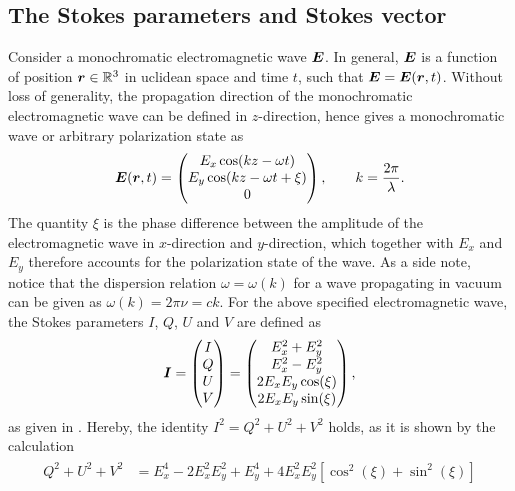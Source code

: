 \documentclass[a4paper,11pt]{report}
\def\lk#1{{\color{black}{#1}}}
\begin{document}
\subsection{The Stokes parameters and Stokes vector}
Consider a monochromatic electromagnetic wave $\bm{E}$. In general, $\bm{E}$ is a function of position $\bm{r} \in \mathbb{R}^3$ in \lk{E}uclidean space and time $t$, such that $\bm{E} = \bm{E}(\bm{r},t)$. Without loss of generality, the propagation direction of the monochromatic electromagnetic wave can be defined in $z$-direction, hence \cite[p.121]{Stix.2002} gives a monochromatic wave or arbitrary polarization state as \begin{equation}\label{eq:E-wave}
\bm{E}(\bm{r},t) = \begin{pmatrix}
E_x \cos(k z - \omega t) \\ E_y \cos(kz-\omega t + \xi) \\ 0
\end{pmatrix}, \qquad k = \frac{2\pi}{\lambda}.
\end{equation} The quantity $\xi$ is the phase difference between the amplitude of the electromagnetic wave in $x$-direction and $y$-direction, which together with $E_x$ and $E_y$ therefore accounts for the polarization state of the wave. As a side note, notice that the dispersion relation $\omega = \omega(k)$ for a wave propagating in vacuum can be given as $\omega(k) = 2\pi\nu = ck$. For the above specified electromagnetic wave, the Stokes parameters $I$, $Q$, $U$ and $V$ are defined as \begin{equation}
\bm{I} = \begin{pmatrix}
I \\ Q \\ U \\ V
\end{pmatrix} = \begin{pmatrix}
E_x^2 + E_y^2 \\ E_x^2 - E_y^2 \\ 2E_xE_y\cos(\xi) \\ 2E_xE_y\sin(\xi)
\end{pmatrix},
\end{equation} as given in \cite[p.121]{Stix.2002}. Hereby, the identity $I^2 = Q^2 + U^2 + V^2$ holds, as it is shown by the calculation \begin{align}
\begin{aligned}
Q^2 + U^2 + V^2 &= E_x^4 - 2E_x^2E_y^2 + E_y^4 + 4E_x^2E_y^2\left[\cos^2(\xi) + \sin^2(\xi)\right] \\

\end{aligned}
\end{align}
\end{document}

